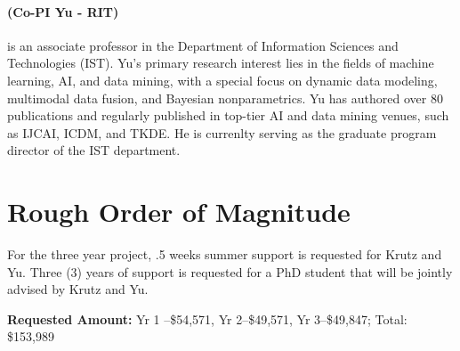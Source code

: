 \documentclass[12pt]{article}
\begin{document}
\vspace{-3mm}\paragraph{(Co-PI Yu - RIT)}is an associate professor in the Department of Information Sciences and Technologies (IST). Yu's primary research interest lies in the fields of machine learning, AI, and data mining, with a special focus on dynamic data modeling, multimodal data fusion, and Bayesian nonparametrics. Yu has authored over 80 publications and regularly published in top-tier AI and data mining venues, such as IJCAI, ICDM, and TKDE. He is currenlty serving as the graduate program director of the IST department. 






\vspace{-3mm}
\section{Rough Order of Magnitude} For the three year project, .5 weeks summer support is requested for Krutz and Yu. Three (3) years of support is requested for a PhD student that will be jointly advised by Krutz and Yu.





\vspace{-0mm} 

\noindent \textbf{Requested Amount: }Yr 1 –\$54,571, Yr 2--\$49,571, Yr 3--\$49,847; Total: \$153,989 
















\label{lastpage}
\cleardoublepage
\end{document}
